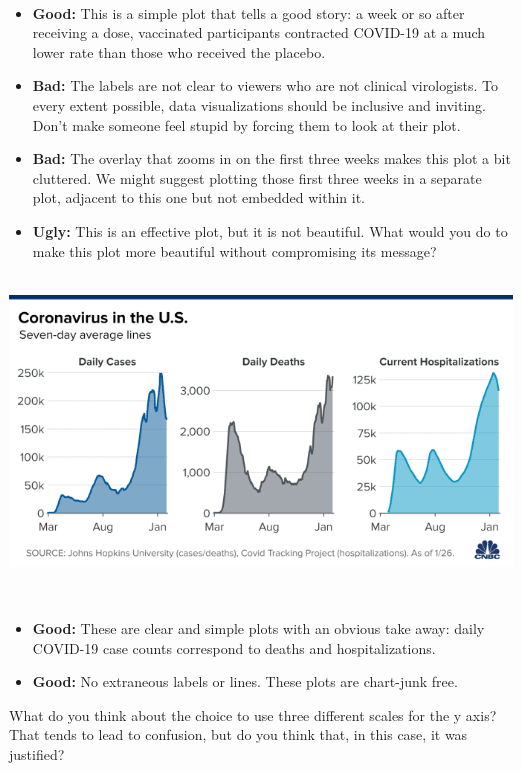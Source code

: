 \documentclass[
]{book}
\begin{document}
~

\begin{itemize}
\item
  \textbf{Good:} This is a simple plot that tells a good story: a week or so after receiving a dose, vaccinated participants contracted COVID-19 at a much lower rate than those who received the placebo.
\item
  \textbf{Bad:} The labels are not clear to viewers who are not clinical virologists. To every extent possible, data visualizations should be inclusive and inviting. Don't make someone feel stupid by forcing them to look at their plot.
\item
  \textbf{Bad:} The overlay that zooms in on the first three weeks makes this plot a bit cluttered. We might suggest plotting those first three weeks in a separate plot, adjacent to this one but not embedded within it.
\item
  \textbf{Ugly:} This is an effective plot, but it is not beautiful. What would you do to make this plot more beautiful without compromising its message?
\end{itemize}

~\\

\includegraphics{img/vise.png}

~

\begin{itemize}
\item
  \textbf{Good:} These are clear and simple plots with an obvious take away: daily COVID-19 case counts correspond to deaths and hospitalizations.
\item
  \textbf{Good:} No extraneous labels or lines. These plots are chart-junk free.
\end{itemize}

What do you think about the choice to use three different scales for the y axis? That tends to lead to confusion, but do you think that, in this case, it was justified?
\end{document}
